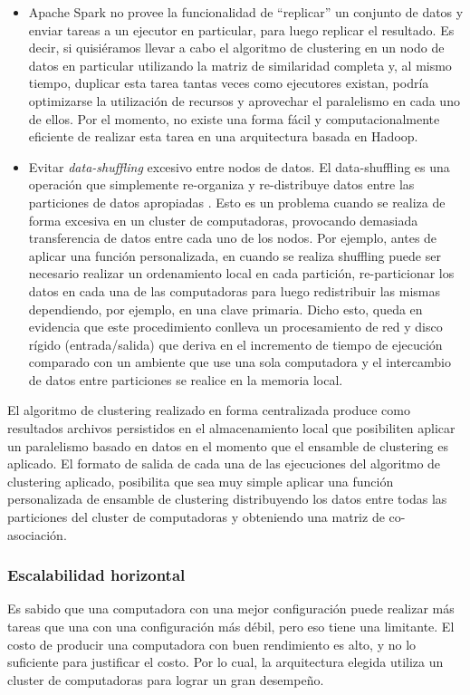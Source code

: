 \begin{itemize}
	\item Apache Spark no provee la funcionalidad de “replicar” un conjunto de datos y enviar tareas a un ejecutor en particular, para luego replicar el resultado. Es decir, si quisiéramos llevar a cabo el algoritmo de clustering en un nodo de datos en particular utilizando la matriz de similaridad completa y, al mismo tiempo, duplicar esta tarea tantas veces como ejecutores existan, podría optimizarse la utilización de recursos y aprovechar el paralelismo en cada uno de ellos. Por el momento, no existe una forma fácil y computacionalmente eficiente de realizar esta tarea en una arquitectura basada en Hadoop.
	\item Evitar \textit{data-shuffling} excesivo entre nodos de datos. El data-shuffling es una operación que simplemente re-organiza y re-distribuye datos entre las particiones de datos apropiadas \citep{zhang2012optimizing}. Esto es un problema cuando se realiza de forma excesiva en un cluster de computadoras, provocando demasiada transferencia de datos entre cada uno de los nodos. Por ejemplo, antes de aplicar una función personalizada, en cuando se realiza shuffling puede ser necesario realizar un ordenamiento local en cada partición, re-particionar los datos en cada una de las computadoras para luego redistribuir las mismas dependiendo, por ejemplo, en una clave primaria. Dicho esto, queda en evidencia que este procedimiento conlleva un procesamiento de red y disco rígido (entrada/salida) que deriva en el incremento de tiempo de ejecución comparado con un ambiente que use una sola computadora y el intercambio de datos entre particiones se realice en la memoria local.
\end{itemize}

El algoritmo de clustering realizado en forma centralizada produce como resultados archivos persistidos en el almacenamiento local que posibiliten aplicar un paralelismo basado en datos en el momento que el ensamble de clustering es aplicado. El formato de salida de cada una de las ejecuciones del algoritmo de clustering aplicado, posibilita que sea muy simple aplicar una función personalizada de ensamble de clustering distribuyendo los datos entre todas las particiones del cluster de computadoras y obteniendo una matriz de co-asociación.

\subsubsection{Escalabilidad horizontal}
Es sabido que una computadora con una mejor configuración puede realizar más tareas que una con una configuración más débil, pero eso tiene una limitante. El costo de producir una computadora con buen rendimiento es alto, y no lo suficiente para justificar el costo. Por lo cual, la arquitectura elegida utiliza un cluster de computadoras para lograr un gran desempeño.


